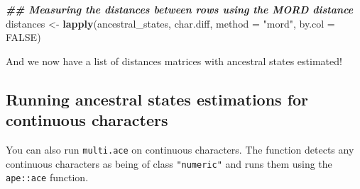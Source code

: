 \documentclass[
]{book}
\newenvironment{Shaded}{\begin{snugshade}}{\end{snugshade}}
\newcommand{\AttributeTok}[1]{\textcolor[rgb]{0.13,0.29,0.53}{#1}}
\newcommand{\ConstantTok}[1]{\textcolor[rgb]{0.56,0.35,0.01}{#1}}
\newcommand{\DecValTok}[1]{\textcolor[rgb]{0.00,0.00,0.81}{#1}}
\newcommand{\DocumentationTok}[1]{\textcolor[rgb]{0.56,0.35,0.01}{\textbf{\textit{#1}}}}
\newcommand{\FunctionTok}[1]{\textcolor[rgb]{0.13,0.29,0.53}{\textbf{#1}}}
\newcommand{\NormalTok}[1]{#1}
\newcommand{\OtherTok}[1]{\textcolor[rgb]{0.56,0.35,0.01}{#1}}
\newcommand{\SpecialCharTok}[1]{\textcolor[rgb]{0.81,0.36,0.00}{\textbf{#1}}}
\newcommand{\StringTok}[1]{\textcolor[rgb]{0.31,0.60,0.02}{#1}}
\begin{document}
\begin{Shaded}
\begin{Highlighting}[]
\DocumentationTok{\#\# Measuring the distances between rows using the MORD distance}
\NormalTok{distances }\OtherTok{\textless{}{-}} \FunctionTok{lapply}\NormalTok{(ancestral\_states, char.diff, }\AttributeTok{method =} \StringTok{"mord"}\NormalTok{, }\AttributeTok{by.col =} \ConstantTok{FALSE}\NormalTok{)}
\end{Highlighting}
\end{Shaded}

And we now have a list of distances matrices with ancestral states estimated!

\hypertarget{running-ancestral-states-estimations-for-continuous-characters}{%
\subsection{Running ancestral states estimations for continuous characters}\label{running-ancestral-states-estimations-for-continuous-characters}}

You can also run \texttt{multi.ace} on continuous characters.
The function detects any continuous characters as being of class \texttt{"numeric"} and runs them using the \texttt{ape::ace} function.

\begin{Shaded}
\end{Shaded}
\end{document}
